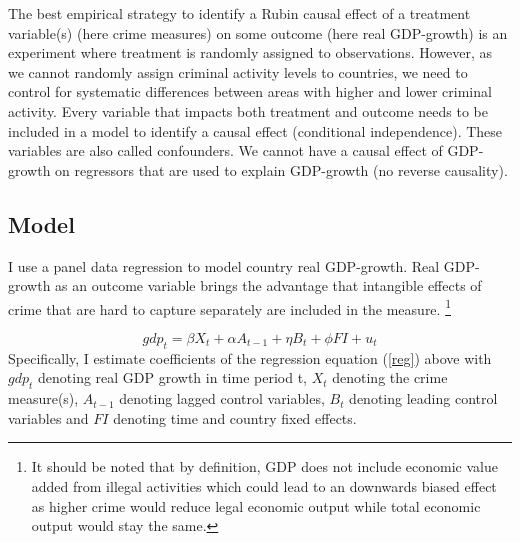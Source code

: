\documentclass[a4paper,12pt]{article}
\begin{document}
The best empirical strategy to identify a Rubin causal effect of a treatment variable(s) (here crime measures) on some outcome (here real GDP-growth) is an experiment where treatment is randomly assigned to observations. However, as we cannot randomly assign criminal activity levels to countries, we need to control for systematic differences between areas with higher and lower criminal activity. 
Every variable that impacts both treatment and outcome needs to be included in a model to identify a causal effect (conditional independence). These variables are also called confounders.
We cannot have a causal effect of GDP-growth on regressors that are used to explain GDP-growth (no reverse causality). 

\subsection{Model}

I use a panel data regression to model country real GDP-growth. 
Real GDP-growth as an outcome variable brings the advantage that intangible effects of crime that are hard to capture separately are included in the measure. \footnote{It should be noted that by definition, GDP does not include economic value added from illegal activities which could lead to an downwards biased effect as higher crime would reduce legal economic output while total economic output would stay the same. }

\begin{equation}
\label{reg}
gdp_t = \beta X_t+ \alpha A_{t-1} + \eta B_t + \phi FI  + u_t
\end{equation}
Specifically, I estimate coefficients of the regression equation (\ref{reg}) above with $gdp_t$ denoting real GDP growth in time period t, $X_t$ denoting the crime measure(s), $A_{t-1}$ denoting lagged control variables, $B_t$ denoting leading control variables and $FI$ denoting time and country fixed effects. 
\end{document}
